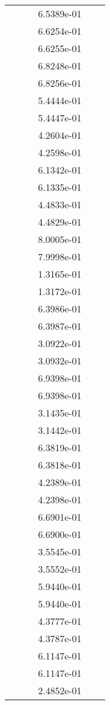 \begin{xltabular}{\textwidth}{r|rS[table-format=1.3e+2]S[table-format=1.4e+2]S[table-format=1.4e+2]S[table-format=-1.5]}
&  &  & 6.5389e-01 & & \\
&  &  & 6.6254e-01 & & \\
&  &  & 6.6255e-01 & & \\
&  &  & 6.8248e-01 & & \\
&  &  & 6.8256e-01 & & \\
&  &  & 5.4444e-01 & & \\
&  &  & 5.4447e-01 & & \\
&  &  & 4.2604e-01 & & \\
&  &  & 4.2598e-01 & & \\
&  &  & 6.1342e-01 & & \\
&  &  & 6.1335e-01 & & \\
&  &  & 4.4833e-01 & & \\
&  &  & 4.4829e-01 & & \\
&  &  & 8.0005e-01 & & \\
&  &  & 7.9998e-01 & & \\
&  &  & 1.3165e-01 & & \\
&  &  & 1.3172e-01 & & \\
&  &  & 6.3986e-01 & & \\
&  &  & 6.3987e-01 & & \\
&  &  & 3.0922e-01 & & \\
&  &  & 3.0932e-01 & & \\
&  &  & 6.9398e-01 & & \\
&  &  & 6.9398e-01 & & \\
&  &  & 3.1435e-01 & & \\
&  &  & 3.1442e-01 & & \\
&  &  & 6.3819e-01 & & \\
&  &  & 6.3818e-01 & & \\
&  &  & 4.2389e-01 & & \\
&  &  & 4.2398e-01 & & \\
&  &  & 6.6901e-01 & & \\
&  &  & 6.6900e-01 & & \\
&  &  & 3.5545e-01 & & \\
&  &  & 3.5552e-01 & & \\
&  &  & 5.9440e-01 & & \\
&  &  & 5.9440e-01 & & \\
&  &  & 4.3777e-01 & & \\
&  &  & 4.3787e-01 & & \\
&  &  & 6.1147e-01 & & \\
&  &  & 6.1147e-01 & & \\
&  &  & 2.4852e-01 & & \\

\end{xltabular}
